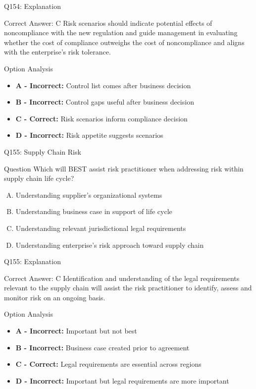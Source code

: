\documentclass{beamer}
\begin{document}
	\begin{frame}{Q154: Explanation}
		\begin{block}{Correct Answer: C}
			Risk scenarios should indicate potential effects of noncompliance with the new regulation and guide management in evaluating whether the cost of compliance outweighs the cost of noncompliance and aligns with the enterprise's risk tolerance.
		\end{block}
		\begin{block}{Option Analysis}
			\begin{itemize}
				\item \textbf{A - Incorrect:} Control list comes after business decision
				\item \textbf{B - Incorrect:} Control gaps useful after business decision
				\item \textbf{C - Correct:} Risk scenarios inform compliance decision
				\item \textbf{D - Incorrect:} Risk appetite suggests scenarios
			\end{itemize}
		\end{block}
	\end{frame}
	
	\begin{frame}{Q155: Supply Chain Risk}
		\begin{block}{Question}
			Which will BEST assist risk practitioner when addressing risk within supply chain life cycle?
		\end{block}
		\begin{enumerate}[(A)]
			\item Understanding supplier's organizational systems
			\item Understanding business case in support of life cycle
			\item Understanding relevant jurisdictional legal requirements
			\item Understanding enterprise's risk approach toward supply chain
		\end{enumerate}
	\end{frame}
	
	\begin{frame}{Q155: Explanation}
		\begin{block}{Correct Answer: C}
			Identification and understanding of the legal requirements relevant to the supply chain will assist the risk practitioner to identify, assess and monitor risk on an ongoing basis.
		\end{block}
		\begin{block}{Option Analysis}
			\begin{itemize}
				\item \textbf{A - Incorrect:} Important but not best
				\item \textbf{B - Incorrect:} Business case created prior to agreement
				\item \textbf{C - Correct:} Legal requirements are essential across regions
				\item \textbf{D - Incorrect:} Important but legal requirements are more important
			\end{itemize}
		\end{block}
	\end{frame}
	
\end{document}
